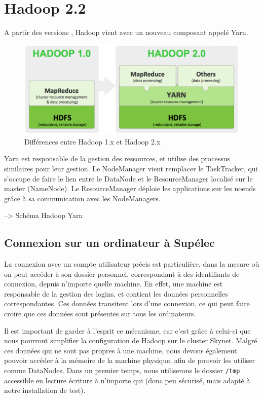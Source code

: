 \section{Hadoop 2.2}
\label{sec:hadoop-2.2}

\par A partir des versions , Hadoop vient avec un nouveau composant appelé Yarn. 

\begin{figure}[h!]
  \centering
  \includegraphics[width=12cm]{images/yarn.png}
  \caption{Différences entre Hadoop 1.x et Hadoop 2.x}
  \label{fig:yarn}
\end{figure}

Yarn est responsable de la gestion des ressources, et utilise des processus similaires pour leur gestion. Le NodeManager vient remplacer le TaskTracker, qui s'occupe de faire le lien entre le DataNode et le ResourceManager localisé sur le master (NameNode). Le ResourceManager déploie les applications sur les noeuds grâce à sa communication avec les NodeManagers.

--> Schéma Hadoop Yarn

\subsection{Connexion sur un ordinateur à Supélec}
\label{sec:connexion-sur-un}

\par La connexion avec un compte utilisateur précis est particulière, dans la mesure où on peut accéder à son dossier personnel, correspondant à des identifiants de connexion, depuis n'importe quelle machine. En effet, une machine est responsable de la gestion des logins, et contient les données personnelles correspondantes. Ces données transitent lors d'une connexion, ce qui peut faire croire que ces données sont présentes sur tous les ordinateurs.

\par Il est important de garder à l'esprit ce mécanisme, car c'est grâce à celui-ci que nous pourront simplifier la configuration de Hadoop sur le cluster Skynet. Malgré ces données qui ne sont pas propres à une machine, nous devons également pouvoir accéder à la mémoire de la machine physique, afin de pouvoir les utiliser comme DataNodes. Dans un premier temps, nous utiliserons le dossier \texttt{/tmp} accessible en lecture écriture à n'importe qui (donc peu sécurisé, mais adapté à notre installation de test).

